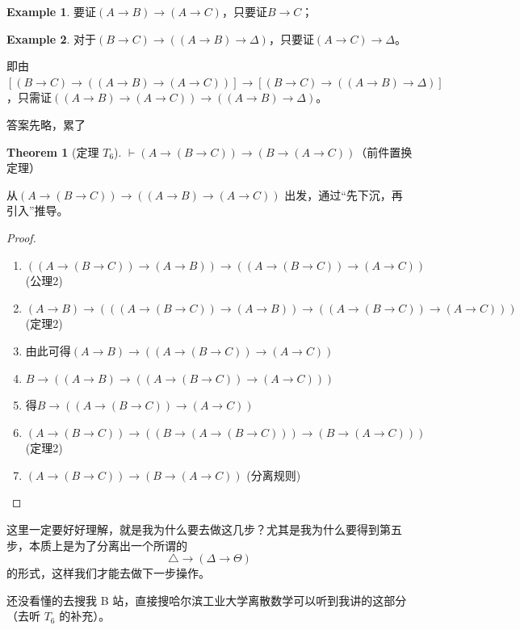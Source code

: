 \documentclass[oneside]{book}
\theoremstyle{definition}
\newtheorem{example}{Example}[section]
\newtheorem{theorem}{Theorem}[section]
\begin{document}
\begin{example}
要证$(A \to B) \to (A \to C)$，只要证$B \to C$；
\end{example}

\begin{example}
	对于$(B \to C) \to ((A \to B) \to \Delta)$，只要证$(A \to C) \to \Delta$。 
	 
	即由$\left[(B \to C) \to ((A \to B) \to (A \to C))\right] \to \left[(B \to C) \to ((A \to B) \to \Delta)\right]$，只需证$((A \to B) \to (A \to C)) \to ((A \to B) \to \Delta)$。
\end{example}

答案先略，累了
\begin{theorem}[定理 \(T_6\)]
	$\vdash (A \to (B \to C)) \to (B \to (A \to C))$（前件置换定理）
\end{theorem}
从$(A \to (B \to C)) \to ((A \to B) \to (A \to C))$ 出发，通过“先下沉，再引入”推导。
\begin{proof}
\begin{enumerate}
	\item$\left((A \to (B \to C)) \to (A \to B)\right) \to \left((A \to (B \to C)) \to (A \to C)\right)$ \hfill (公理2)
	\item$(A \to B) \to \left(\left((A \to (B \to C)) \to (A \to B)\right) \to \left((A \to (B \to C)) \to (A \to C)\right)\right)$ \hfill (定理2)
	\item 由此可得$(A \to B) \to \left((A \to (B \to C)) \to (A \to C)\right)$
	\item$B \to \left((A \to B) \to \left((A \to (B \to C)) \to (A \to C)\right)\right)$
	\item 得$B \to \left((A \to (B \to C)) \to (A \to C)\right)$
	\item $\left(A \to (B \to C)\right) \to \left( \left(B \to (A \to (B \to C))\right) \to \left(B \to (A \to C)\right) \right)$ \hfill (定理2)
	\item $\left(A \to (B \to C)\right) \to \left(B \to (A \to C)\right)$ \hfill (分离规则)
\end{enumerate}
\end{proof}
这里一定要好好理解，就是我为什么要去做这几步？尤其是我为什么要得到第五步，本质上是为了分离出一个所谓的
\[\triangle\to(\Delta\to \Theta)\]
的形式，这样我们才能去做下一步操作。

还没看懂的去搜我 B 站，直接搜哈尔滨工业大学离散数学可以听到我讲的这部分（去听 \(T_6\) 的补充）。
\end{document}
